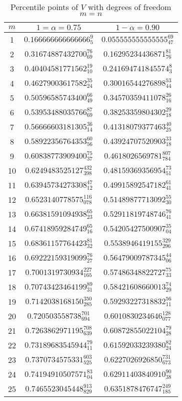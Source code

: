 \begin{table}[ht!]
\caption{\label{table:gupta} Percentile points of $V$ with degrees of freedom $m=n$}
\begin{center}
\renewcommand{\arraystretch}{1.3}
\begin{tabular}{c|c|c}
$m$ & $1=\alpha=0.75$ & $1-\alpha=0.90$ \\ \hline
1 & $0.166666666666666^{9}_{5} $ & $0.055555555555555^{69}_{47 }$\\
2 & $0.31674887432700^{76}_{69} $ & $0.16295234436871^{81}_{76 }$\\
3 & $0.40404581771562^{19}_{10} $ & $0.241694741845574^{8}_{3 }$\\
4 & $0.46279003617582^{35}_{24} $ & $0.30016544276898^{53}_{44 }$\\
5 & $0.50596585743400^{66}_{49} $ & $0.34570359411078^{26}_{16 }$\\
6 & $0.53953488035766^{87}_{69} $ & $0.38253359804302^{29}_{18 }$\\
7 & $0.56666603181305^{36}_{14} $ & $0.41318079377463^{40}_{25 }$\\
8 & $0.58922356764353^{60}_{56} $ & $0.43924707520903^{33}_{18 }$\\
9 & $0.60838773909400^{75}_{37} $ & $0.4618026569781^{807}_{784 }$\\
10 & $0.6249483525127^{432}_{398} $ & $0.48159369356954^{73}_{51 }$\\
11 & $0.63945734273308^{47}_{12} $ & $0.49915892547182^{61}_{41 }$\\
12 & $0.6523140778575^{116}_{078} $ & $0.51489877713092^{55}_{30 }$\\
13 & $0.66381591094938^{65}_{23} $ & $0.52911819748746^{76}_{41 }$\\
14 & $0.67418959284749^{65}_{16} $ & $0.54205427500907^{35}_{04 }$\\
15 & $0.68361157764423^{81}_{32} $ & $0.5538946419155^{329}_{296 }$\\
16 & $0.69222159319099^{76}_{27} $ & $0.56479009787345^{44}_{06 }$\\
17 & $0.7001319730934^{227}_{165} $ & $0.57486348822727^{75}_{33 }$\\
18 & $0.70743423464199^{89}_{31} $ & $0.58421608660013^{74}_{29 }$\\
19 & $0.7142038168150^{350}_{285} $ & $0.59293227318832^{56}_{11 }$\\
20 & $0.720503558738^{701}_{694} $ & $0.6010830234646^{128}_{077 }$\\
21 & $0.7263862971195^{708}_{639} $ & $0.60872855022104^{79}_{28 }$\\
22 & $0.73189683545944^{79}_{11} $ & $0.61592033239380^{82}_{24 }$\\
23 & $0.7370734575331^{603}_{525} $ & $0.6227026926850^{731}_{673 }$\\
24 & $0.74194910507571^{83}_{04} $ & $0.62911403840910^{90}_{38 }$\\
25 & $0.7465523045448^{913}_{829} $ & $0.6351878476747^{249}_{185}$
\end{tabular}
\end{center}
\end{table}

